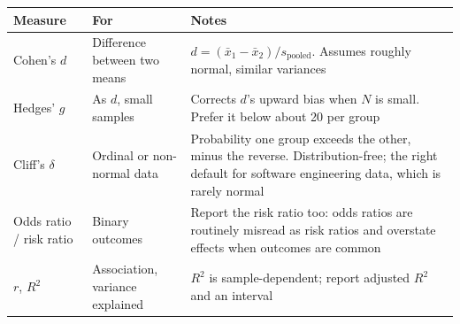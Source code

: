 \begin{center}
\small
\begin{tabular}{@{}L{3.0cm}L{4.6cm}L{6.7cm}@{}}
\toprule
\textbf{Measure} & \textbf{For} & \textbf{Notes} \\
\midrule
Cohen's $d$
  & Difference between two means
  & $d = (\bar{x}_1 - \bar{x}_2)/s_{\text{pooled}}$. Assumes roughly normal,
    similar variances \\
Hedges' $g$
  & As $d$, small samples
  & Corrects $d$'s upward bias when $N$ is small. Prefer it below about 20 per
    group \\
Cliff's $\delta$
  & Ordinal or non-normal data
  & Probability one group exceeds the other, minus the reverse.
    Distribution-free; the right default for software engineering data, which
    is rarely normal \\
Odds ratio / risk ratio
  & Binary outcomes
  & Report the risk ratio too: odds ratios are routinely misread as risk
    ratios and overstate effects when outcomes are common \\
$r$, $R^2$
  & Association, variance explained
  & $R^2$ is sample-dependent; report adjusted $R^2$ and an interval \\
\bottomrule
\end{tabular}
\end{center}

